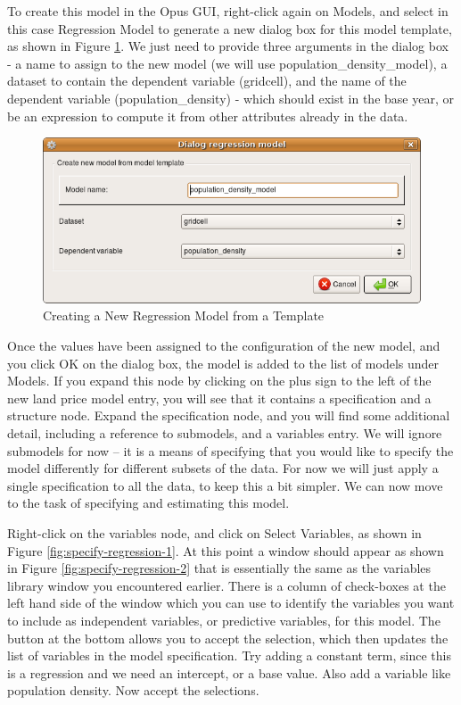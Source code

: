 To create this model in the Opus GUI, right-click again on Models, and select in this case Regression Model to generate a new dialog box for this model template, as shown in Figure \ref{fig:create-regression-model}.  We just need to provide three arguments in the dialog box - a name to assign to the new model (we will use population\_density\_model), a dataset to contain the dependent variable (gridcell), and the name of the dependent variable (population\_density) - which should exist in the base year, or be an expression to compute it from other attributes already in the data.


\begin{figure}[htp]
\begin{center}
\includegraphics[scale=0.6]{part-gui/images/model-manager-create-regression-model-from-template.png}
\end{center}
\caption{Creating a New Regression Model from a Template}
\label{fig:create-regression-model}
\end{figure}

Once the values have been assigned to the configuration of the new model, and you click OK on the dialog box, the model is added to the list of models under Models.  If you expand this node by clicking on the plus sign to the left of the new land price model entry, you will see that it contains a specification and a structure node.  Expand the specification node, and you will find some additional detail, including a reference to submodels, and a variables entry.  We will ignore submodels for now -- it is a means of specifying that you would like to specify the model differently for different subsets of the data.  For now we will just apply a single specification to all the data, to keep this a bit simpler.  We can now move to the task of specifying and estimating this model. 

Right-click on the variables node, and click on Select Variables, as shown in Figure \ref{fig:specify-regression-1}.  At this point a window should appear as shown in Figure \ref{fig:specify-regression-2} that is essentially the same as the variables library window you encountered earlier.  There is a column of check-boxes at the left hand side of the window which you can use to identify the variables you want to include as independent variables, or predictive variables, for this model.  The button at the bottom allows you to accept the selection, which then updates the list of variables in the model specification.  Try adding a constant term, since this is a regression and we need an intercept, or a base value.  Also add a variable like population density.  Now accept the selections.


